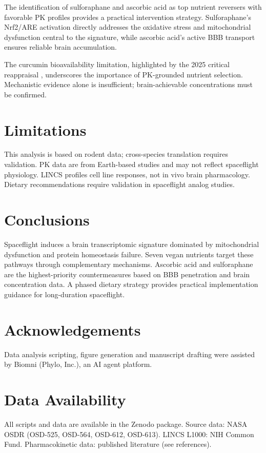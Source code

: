 \documentclass[11pt,a4paper]{article}
\begin{document}
The identification of sulforaphane and ascorbic acid as top nutrient reversers with favorable PK profiles provides a practical intervention strategy. Sulforaphane's Nrf2/ARE activation directly addresses the oxidative stress and mitochondrial dysfunction central to the signature, while ascorbic acid's active BBB transport ensures reliable brain accumulation.

The curcumin bioavailability limitation, highlighted by the 2025 critical reappraisal \citep{Kroon2025}, underscores the importance of PK-grounded nutrient selection. Mechanistic evidence alone is insufficient; brain-achievable concentrations must be confirmed.

\section{Limitations}
This analysis is based on rodent data; cross-species translation requires validation. PK data are from Earth-based studies and may not reflect spaceflight physiology. LINCS profiles cell line responses, not in vivo brain pharmacology. Dietary recommendations require validation in spaceflight analog studies.

\section{Conclusions}
Spaceflight induces a brain transcriptomic signature dominated by mitochondrial dysfunction and protein homeostasis failure. Seven vegan nutrients target these pathways through complementary mechanisms. Ascorbic acid and sulforaphane are the highest-priority countermeasures based on BBB penetration and brain concentration data. A phased dietary strategy provides practical implementation guidance for long-duration spaceflight.

\section*{Acknowledgements}
Data analysis scripting, figure generation and manuscript drafting were assisted by Biomni (Phylo, Inc.), an AI agent platform.

\section*{Data Availability}
All scripts and data are available in the Zenodo package. Source data: NASA OSDR (OSD-525, OSD-564, OSD-612, OSD-613). LINCS L1000: NIH Common Fund. Pharmacokinetic data: published literature (see references).
\end{document}
